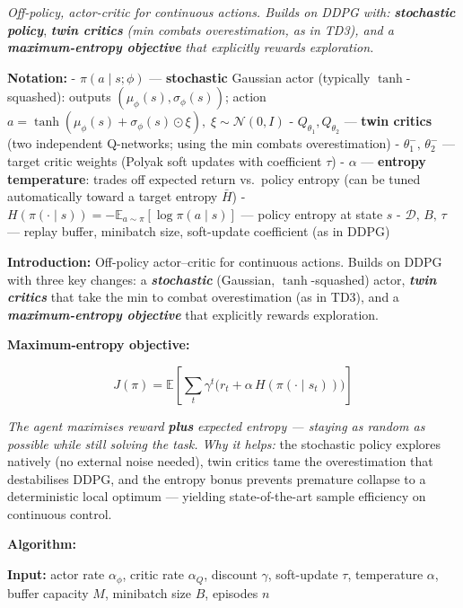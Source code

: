 \documentclass[11pt]{article}
\begin{document}
    \emph{Off-policy, actor-critic for continuous actions. Builds on DDPG
with:} \textbf{\emph{stochastic policy}}, \textbf{\emph{twin critics}}
\emph{(min combats overestimation, as in TD3), and a}
\textbf{\emph{maximum-entropy objective}} \emph{that explicitly rewards
exploration.}

    \textbf{Notation:} - \(\pi(a \mid s;\phi)\) --- \textbf{stochastic}
Gaussian actor (typically \(\tanh\)-squashed): outputs
\((\mu_\phi(s), \sigma_\phi(s))\); action
\(a = \tanh(\mu_\phi(s) + \sigma_\phi(s) \odot \xi),\; \xi \sim \mathcal{N}(0, I)\)
- \(Q_{\theta_1}, Q_{\theta_2}\) --- \textbf{twin critics} (two
independent Q-networks; using the min combats overestimation) -
\(\theta_1^-,\,\theta_2^-\) --- target critic weights (Polyak soft
updates with coefficient \(\tau\)) - \(\alpha\) --- \textbf{entropy
temperature}: trades off expected return vs.~policy entropy (can be
tuned automatically toward a target entropy \(\bar{H}\)) -
\(H(\pi(\cdot \mid s)) = -\mathbb{E}_{a\sim\pi}[\log\pi(a \mid s)]\) ---
policy entropy at state \(s\) - \(\mathcal{D},\,B,\,\tau\) --- replay
buffer, minibatch size, soft-update coefficient (as in DDPG)

    \label{intro-4-6}

    \textbf{Introduction:} Off-policy actor--critic for continuous actions.
Builds on DDPG with three key changes: a \textbf{\emph{stochastic}}
(Gaussian, \(\tanh\)-squashed) actor, \textbf{\emph{twin critics}} that
take the min to combat overestimation (as in TD3), and a
\textbf{\emph{maximum-entropy objective}} that explicitly rewards
exploration.

\textbf{Maximum-entropy objective:}

\[J(\pi) = \mathbb{E}\!\left[\sum_t \gamma^t \bigl(r_t + \alpha\, H(\pi(\cdot \mid s_t))\bigr)\right]\]

\emph{The agent maximises reward} \textbf{\emph{plus}} \emph{expected
entropy --- staying as random as possible while still solving the task.
Why it helps:} the stochastic policy explores natively (no external
noise needed), twin critics tame the overestimation that destabilises
DDPG, and the entropy bonus prevents premature collapse to a
deterministic local optimum --- yielding state-of-the-art sample
efficiency on continuous control.

    \textbf{Algorithm:}

\textbf{Input:} actor rate \(\alpha_\phi\), critic rate \(\alpha_Q\),
discount \(\gamma\), soft-update \(\tau\), temperature \(\alpha\),
buffer capacity \(M\), minibatch size \(B\), episodes \(n\)
\end{document}
